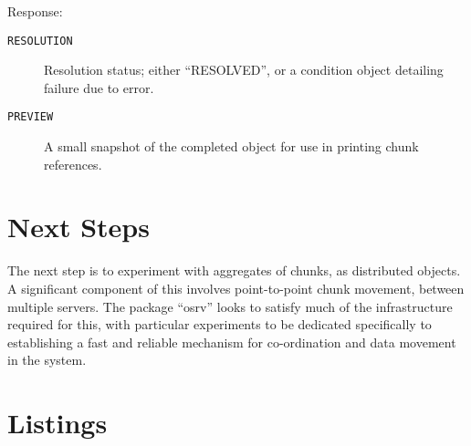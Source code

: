 \documentclass[a4paper,10pt]{article}
\begin{document}
Response:
\begin{description}
	\item[\texttt{RESOLUTION}] Resolution status; either ``RESOLVED'', or a
		condition object detailing failure due to error.
	\item[\texttt{PREVIEW}]  A small snapshot of the completed object for
		use in printing chunk references.
\end{description}

\section{Next Steps}

The next step is to experiment with aggregates of chunks, as distributed objects.
A significant component of this involves point-to-point chunk movement, between multiple servers.
The package ``osrv'' looks to satisfy much of the infrastructure required for
this, with particular experiments to be dedicated specifically to establishing
a fast and reliable mechanism for co-ordination and data movement in the system.

\section{Listings}\label{sec:listings}

\newpage








\end{document}
